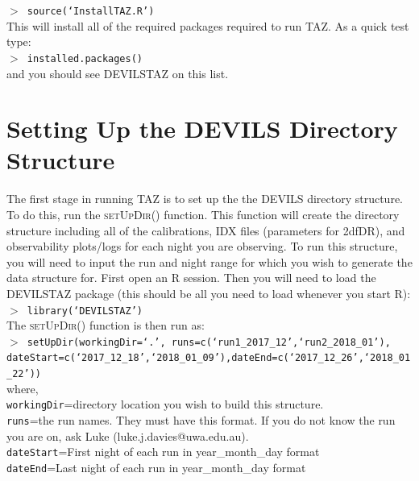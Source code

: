 \documentclass[12pt]{article}
\begin{document}
\hspace{10mm}  \texttt{$>$ source(`InstallTAZ.R')}\\

This will install all of the required packages required to run \textsc{TAZ}. As a quick test type:\\

\hspace{10mm}  \texttt{$>$ installed.packages()}\\

and you should see DEVILSTAZ on this list.

\section{Setting Up the DEVILS Directory Structure}

The first stage in running \textsc{TAZ} is to set up the the DEVILS directory structure. To do this, run the \textsc{setUpDir()} function. This function will create the directory structure including all of the calibrations, IDX files (parameters for 2dfDR), and observability plots/logs for each night you are observing.  To run this structure, you will need to input the run and night range for which you wish to generate the data structure for. First open an R session. Then you will need to load the \textsc{DEVILSTAZ} package (this should be all you need to load whenever you start R):\\

\hspace{10mm}  \texttt{$>$ library(`DEVILSTAZ')}\\

The \textsc{setUpDir()}  function is then run as:\\

\hspace{10mm}  \texttt{$>$ setUpDir(workingDir=`.', runs=c(`run1\_2017\_12',`run2\_2018\_01'), \\ dateStart=c(`2017\_12\_18',`2018\_01\_09'),dateEnd=c(`2017\_12\_26',`2018\_01\_22')) }\\


where, \\

 \texttt{workingDir}=directory location you wish to build this structure.\\
 \texttt{runs}=the run names. They must have this format. If you do not know the run you are on, ask Luke (luke.j.davies@uwa.edu.au).\\
 \texttt{dateStart}=First night of each run in year\_month\_day format\\
 \texttt{dateEnd}=Last night of each run in year\_month\_day format\\
\end{document}
